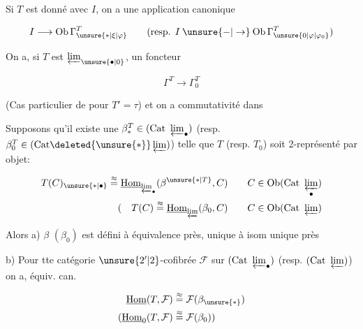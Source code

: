 Si $T$ est donné avec $I$, on a une application canonique

\[
 I\longrightarrow\mathrm{Ob}\,\Gamma^{T}_{\unsure{*|\xi|\varphi}}
 \qquad(\text{resp. }I\mathbin{\unsure{-|\to}}\mathrm{Ob}\,\Gamma_{\unsure{0|\varphi|\varphi_0}}^{T})
\]

On a, si $T$ est  $\varprojlim_{\unsure{\bullet|0}}$, un foncteur

\[
\Gamma^{T}\longrightarrow\Gamma_0^{T}
\]

(Cas particulier de \hspace{1em} pour $T'=\tau$) et on a
commutativité dans


\uline{} Supposons qu'il existe une $\beta^{T}_{*}\in(\mathrm{Cat}\ \varprojlim_{\bullet})$
(resp. $\beta^{T}_0\in(\mathrm{Cat}\deleted{\unsure{*}}\varprojlim)$) telle que $T$ (resp. $T_0$)
soit  2-représenté par  objet:

\[
\begin{aligned}
T(C)_{\unsure{*|\bullet}}\mathrel{\mathop{=}^{\approx}}\underline{\mathrm{Hom}}_{\varprojlim_{\bullet}}(\beta^{\unsure{*|T}},C)
&\qquad C\in\mathrm{Ob}(\mathrm{Cat}\ \varprojlim_{\bullet})\\
(\quad T(C)\mathrel{\mathop{=}^{\approx}}\underline{\mathrm{Hom}}_{\varprojlim}(\beta_0,C)
&\qquad C\in\mathrm{Ob}(\mathrm{Cat}\ \varprojlim)
\end{aligned}
\]

Alors a) $\beta$ $(\beta_0)$ est défini à équivalence près,
 unique à isom unique près

b) Pour tte catégorie $\unsure{2'|2}$-cofibrée $\mathcal F$  sur $(\mathrm{Cat}\ \varprojlim_{\bullet})$
(resp. $(\mathrm{Cat}\ \varprojlim)$) on a, équiv. can.

\[
\begin{aligned}
\underline{\mathrm{Hom}}(T,\mathcal F)&\mathrel{\mathop{=}^{\approx}}\mathcal F(\beta_{\unsure{*}})\\
(\underline{\mathrm{Hom}}_0(T,\mathcal F)&\mathrel{\mathop{=}^{\approx}}\mathcal F(\beta_0))
\end{aligned}
\]

